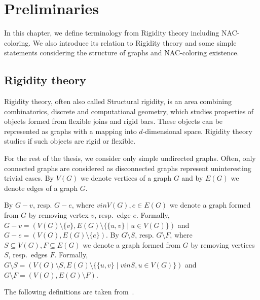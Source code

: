 
\chapter{Preliminaries}%
\label{chapter:preliminaries}

\begin{chapterabstract}

	In this chapter, we define terminology from Rigidity theory including NAC-coloring.
	We also introduce its relation to Rigidity theory and
	some simple statements considering
	the structure of graphs and NAC-coloring existence.

\end{chapterabstract}

\section{Rigidity theory}

Rigidity theory, often also called Structural rigidity,
is an area combining combinatorics, discrete and computational geometry,
which studies properties of objects formed from flexible joins and rigid bars.
These objects can be represented as graphs with
a mapping into \( d \)-dimensional space.
Rigidity theory studies if such objects are rigid or flexible.

For the rest of the thesis,
we consider only simple undirected graphs.
Often, only connected graphs are considered as disconnected graphs
represent uninteresting trivial cases.
By \( V(G) \) we denote vertices of a graph \( G \) and
by \( E(G) \) we denote edges of a graph \( G \).

By \( G - v \), resp. \( G - e \),
where \( v in V(G), e \in E(G) \) we denote a graph
formed from \( G \) by removing vertex \( v \), resp.\ edge \( e \).
Formally,
\( G - v = (V(G) \setminus \{v\}, E(G) \setminus \{\{u, v\} \mid u \in V(G)\}) \)
and \( G - e = (V(G), E(G) \setminus \{e\}) \).
By \( G \setminus S \), resp. \( G \setminus F \),
where \( S \subseteq V(G), F \subseteq E(G) \) we denote a graph
formed from \( G \) by removing vertices \( S \), resp.\ edges \( F \).
Formally,
\( G \setminus S = (V(G) \setminus S, E(G) \setminus \{\{u, v\} \mid v in S, u \in V(G)\}) \)
and \( G \setminus F = (V(G), E(G) \setminus F) \).

The following definitions are taken from~\cite{np_complete,my_paper}.


